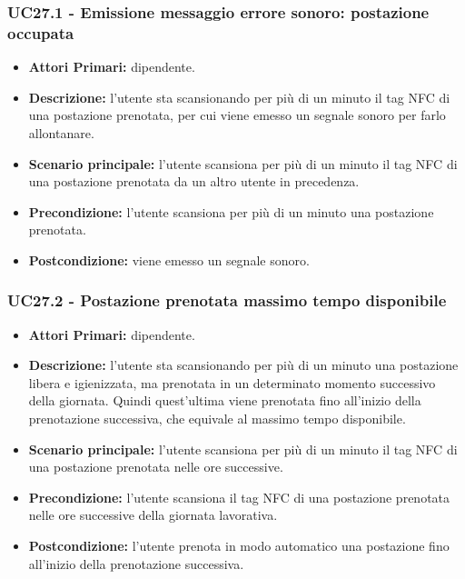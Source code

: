 \subsubsection{ UC27.1 - Emissione messaggio errore sonoro: postazione occupata}
\begin{itemize}
	\item\textbf{Attori Primari:} dipendente.
	\item\textbf{Descrizione:} l'utente sta scansionando per più di un minuto il tag NFC di una postazione prenotata, per cui viene emesso un segnale sonoro per farlo allontanare.
	\item\textbf{Scenario principale:} l’utente scansiona per più di un minuto il tag NFC di una postazione prenotata da un altro utente in precedenza.
	\item\textbf{Precondizione:} l'utente scansiona per più di un minuto una postazione prenotata.
	\item\textbf{Postcondizione:} viene emesso un segnale sonoro.
\end{itemize}

\subsubsection{ UC27.2 - Postazione prenotata massimo tempo disponibile}
\begin{itemize}
	\item\textbf{Attori Primari:} dipendente.
	\item\textbf{Descrizione:} l'utente sta scansionando per più di un minuto una postazione libera e igienizzata, ma prenotata in un determinato momento successivo della giornata. Quindi quest'ultima viene prenotata fino all'inizio della prenotazione successiva, che equivale al massimo tempo disponibile.
	\item\textbf{Scenario principale:} l'utente scansiona per più di un minuto il tag NFC di una postazione prenotata nelle ore successive.
	\item\textbf{Precondizione:} l'utente scansiona il tag NFC di una postazione prenotata nelle ore successive della giornata lavorativa.
	\item\textbf{Postcondizione:} l'utente prenota in modo automatico una postazione fino all'inizio della prenotazione successiva.
\end{itemize}

